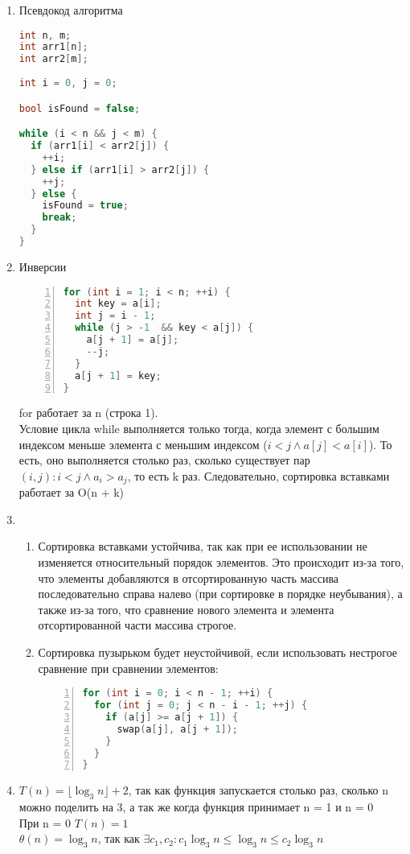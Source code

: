 \documentclass{article}
\begin{document}
\begin{enumerate}
\begin{proof}
    \end{proof}
  \item Псевдокод алгоритма
    \begin{lstlisting}[language=c++]
int n, m;
int arr1[n];
int arr2[m];
    
int i = 0, j = 0;

bool isFound = false;

while (i < n && j < m) {
  if (arr1[i] < arr2[j]) {
    ++i;
  } else if (arr1[i] > arr2[j]) {
    ++j;
  } else {
    isFound = true;
    break;
  }
}
    \end{lstlisting}
  \item Инверсии 
    \begin{lstlisting}[language=c++, numbers=left, xleftmargin=3.5ex]
for (int i = 1; i < n; ++i) {      
  int key = a[i];
  int j = i - 1;
  while (j > -1  && key < a[j]) {   
    a[j + 1] = a[j];
    --j; 
  }
  a[j + 1] = key;
}
    \end{lstlisting}

    for работает за n (строка 1). \\ 
    Условие цикла while выполняется только тогда, когда элемент с большим индексом меньше элемента с меньшим индексом ($i < j \wedge a[j] < a[i]$). То есть, оно выполняется столько раз, сколько существует пар $(i, j): i < j \wedge a_i > a_j$, то есть k раз.
    Следовательно, сортировка вставками работает за O(n + k)

    \item
    \begin{enumerate}

      \item Сортировка вставками устойчива, так как при ее использовании не изменяется относительный порядок элементов. Это происходит из-за того, что элементы добавляются в отсортированную часть массива последовательно справа налево (при сортировке в порядке неубывания), а также из-за того, что сравнение нового элемента и элемента отсортированной части массива строгое.
      \item Сортировка пузырьком будет неустойчивой, если использовать нестрогое сравнение при сравнении элементов:
      \begin{lstlisting}[language=c++, numbers=left, xleftmargin=3.5ex]
for (int i = 0; i < n - 1; ++i) {
  for (int j = 0; j < n - i - 1; ++j) {
    if (a[j] >= a[j + 1]) {
      swap(a[j], a[j + 1]);
    }
  }
}
      \end{lstlisting}
    \end{enumerate}

  \item $T(n) = \lfloor \log_3 n \rfloor + 2$, так как функция запускается столько раз, сколько n можно поделить на 3, а так же когда функция принимает n = 1 и n = 0 \\ 
    При n = 0 $T(n) = 1$ \\
    $\theta (n) = \log_3 n$, так как $ \exists c_1, c_2 : c_1 \log_3 n \leq \log_3 n \leq c_2 \log_3 n$ 
\end{enumerate}
\end{document}
